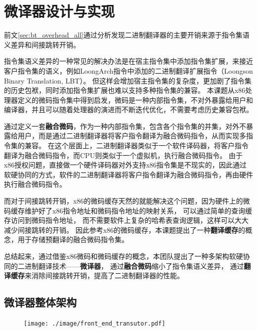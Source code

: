 \section{微译器设计与实现}\label{chap:MUT}

前文\ref{sec:bt_overhead_all}通过分析发现二进制翻译器的主要开销来源于指令集语义差异和间接跳转开销。

指令集语义差异的一种常见的解决办法是在宿主指令集中添加指令集扩展，来接近客户指令集的语义，例如LoongArch指令中添加的二进制翻译扩展指令（Loongson Binary Translation, LBT）\cite{LoongArch2023}。
但这样会增加宿主指令集的复杂度，更加剧了指令集的历史包袱，同时添加指令集扩展也难以支持多种指令集的兼容。
本课题从x86处理器定义的微码指令集中得到启发，微码是一种内部指令集，不对外暴露给用户和编译器，并且可以随着处理器的演进而不断迭代优化，不需要考虑历史兼容包袱。

通过定义一套\textbf{融合微码}，作为一种内部指令集，包含各个指令集的并集，对外不暴露给用户，而是通过二进制翻译器将客户指令翻译为融合微码指令，从而实现多指令集的兼容。
在这个层面上，二进制翻译器类似于一个软件译码器，将客户指令翻译为融合微码指令，而CPU则类似于一个虚拟机，执行融合微码指令。
由于x86授权问题，直接做一个硬件译码器对外支持x86指令集是不现实的，因此通过软硬协同的方式，软件的二进制翻译器将客户指令翻译为融合微码指令，再由硬件执行融合微码指令。

而对于间接跳转开销，x86的微码缓存天然的就能解决这个问题，因为硬件上的微码缓存维护好了x86指令地址和微码指令地址的映射关系，
可以通过简单的查询缓存访问到微码指令地址，
而不需要软件上复杂的哈希表查询逻辑，这样可以大大减少间接跳转的开销。
因此参考x86的微码缓存，本课题提出了一种\textbf{翻译缓存}的概念，用于存储预翻译的融合微码指令集。

总结起来，通过借鉴x86微码和微码缓存的概念，本团队提出了一种多架构软硬协同的二进制翻译技术——\textbf{微译器}，
通过\textbf{融合微码}缩小了指令集语义差异，
通过\textbf{翻译缓存}来消除间接跳转开销，提高了二进制翻译器的性能。

\subsection{微译器整体架构}

\begin{figure}[!htbp]
  \centering
  \texttt{[image: ./image/front\_end\_transutor.pdf]}
  \label{img:front_end_transutor}
\end{figure}

